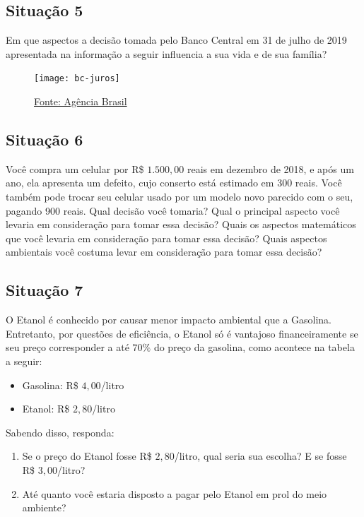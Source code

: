 \subsection{Situação 5}
Em que aspectos a decisão tomada pelo Banco Central em 31 de julho de 2019 apresentada na informação a seguir influencia a sua vida e de sua família?

\begin{figure}[H]

\centering
\noindent\texttt{[image: bc-juros]}

\caption{\href{http://agenciabrasil.ebc.com.br/economia/noticia/2019-07/banco-central-surpreende-e-reduz-juros-basicos-para-6-ao-ano. Acesso em 15 de Agosto de 2019.}{Fonte: Agência Brasil}}
\end{figure}

\subsection{Situação 6}
Você compra um celular por R\$ $1.500{,}00$ reais em dezembro de 2018, e após um ano, ela apresenta um defeito, cujo conserto está estimado em 300 reais. Você também pode trocar seu celular usado por um modelo novo parecido com o seu, pagando 900 reais. Qual decisão você tomaria? Qual o principal aspecto você levaria em consideração para tomar essa decisão? Quais os aspectos matemáticos que você levaria em consideração para tomar essa decisão? Quais aspectos ambientais você costuma levar em consideração para tomar essa decisão?

\subsection{Situação 7}
O Etanol é conhecido por causar menor impacto ambiental que a Gasolina. Entretanto, por questões de eficiência, o Etanol só é vantajoso financeiramente se seu preço corresponder a até $70\%$ do preço da gasolina, como acontece na tabela a seguir:


\begin{itemize}

\item Gasolina: R\$ $4{,}00$/litro 
\item Etanol: R\$ $2{,}80$/litro 

\end{itemize}

Sabendo disso, responda:

\begin{enumerate}
   \item Se o preço do Etanol fosse R\$ $2{,}80$/litro, qual seria sua escolha? E se fosse R\$ $3{,}00$/litro?
   \item Até quanto você estaria disposto a pagar pelo Etanol em prol do meio ambiente?
\end{enumerate}

